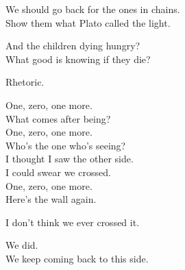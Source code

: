 \begin{lyrics}

We should go back for the ones in chains.\\
Show them what Plato called the light.

And the children dying hungry?\\
What good is knowing if they die?

Rhetoric.

One, zero, one more.\\
What comes after being?\\
One, zero, one more.\\
Who’s the one who’s seeing?\\
I thought I saw the other side.\\
I could swear we crossed.\\
One, zero, one more.\\
Here’s the wall again.


I don’t think we ever crossed it.

We did.\\
We keep coming back to this side.
\end{lyrics}


